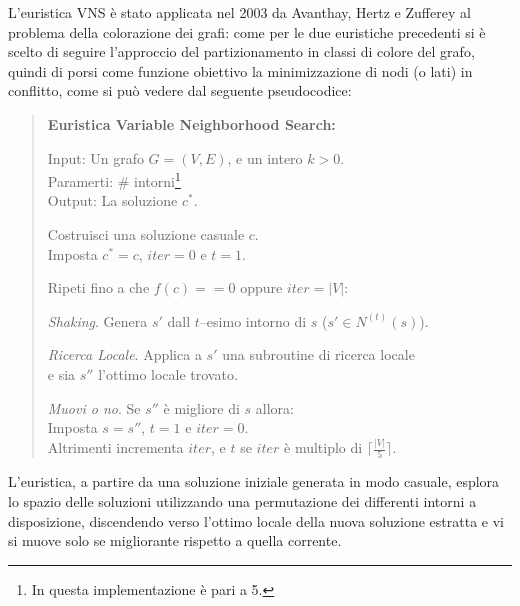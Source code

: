 \documentclass[a4paper,10pt]{article}
\begin{document}
L'euristica VNS è stato applicata nel 2003 da Avanthay, Hertz e Zufferey \cite{vns_hertz} al problema della colorazione dei grafi: come per le due euristiche precedenti si è scelto di seguire l'approccio del partizionamento in classi di colore del grafo, quindi di porsi come funzione obiettivo la minimizzazione di nodi (o lati) in conflitto, come si può vedere dal seguente pseudocodice:

\begin{quote}
\textbf{Euristica Variable Neighborhood Search:}

Input: Un grafo $G=(V,E)$, e un intero $k>0$.\\
Paramerti: \# intorni\footnote{In questa implementazione è pari a 5.} \\
Output: La soluzione $c^{*}$.

Costruisci una soluzione casuale $c$.\\
Imposta $c^{*}=c$, $iter=0$ e $t=1$.

Ripeti fino a che $f(c)==0$ oppure $iter=|V|$:

\hspace*{8pt}\emph{Shaking}. Genera $s'$ dall $t$--esimo intorno di $s$ ($s' \in N^{(t)}(s)$).

\hspace*{8pt}\emph{Ricerca Locale}. Applica a $s'$ una subroutine di ricerca locale\\ 
\hspace*{78pt}e sia $s''$ l'ottimo locale trovato.

\hspace*{8pt}\emph{Muovi o no}. Se $s''$ è migliore di $s$ allora:\\
\hspace*{16pt}Imposta $s=s''$, $t=1$ e $iter=0$.\\
\hspace*{16pt}Altrimenti incrementa $iter$, e $t$ se $iter$ è multiplo di $\lceil\frac{|V|}{5}\rceil$.
\end{quote}

L'euristica, a partire da una soluzione iniziale generata in modo casuale, esplora lo spazio delle soluzioni utilizzando una permutazione dei differenti intorni a disposizione, discendendo verso l'ottimo locale della nuova soluzione estratta e vi si muove solo se migliorante rispetto a quella corrente.
\end{document}

